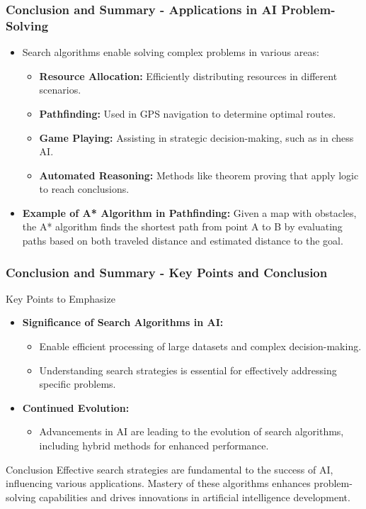 \documentclass[aspectratio=169]{beamer}
\begin{document}
\begin{frame}[fragile]
    \frametitle{Conclusion and Summary - Applications in AI Problem-Solving}
    \begin{itemize}
        \item Search algorithms enable solving complex problems in various areas:
            \begin{itemize}
                \item \textbf{Resource Allocation:} Efficiently distributing resources in different scenarios.
                \item \textbf{Pathfinding:} Used in GPS navigation to determine optimal routes.
                \item \textbf{Game Playing:} Assisting in strategic decision-making, such as in chess AI.
                \item \textbf{Automated Reasoning:} Methods like theorem proving that apply logic to reach conclusions.
            \end{itemize}

        \item \textbf{Example of A* Algorithm in Pathfinding:}
            Given a map with obstacles, the A* algorithm finds the shortest path from point A to B by evaluating paths based on both traveled distance and estimated distance to the goal.
    \end{itemize}
\end{frame}

\begin{frame}[fragile]
    \frametitle{Conclusion and Summary - Key Points and Conclusion}
    \begin{block}{Key Points to Emphasize}
        \begin{itemize}
            \item \textbf{Significance of Search Algorithms in AI:}
                \begin{itemize}
                    \item Enable efficient processing of large datasets and complex decision-making.
                    \item Understanding search strategies is essential for effectively addressing specific problems.
                \end{itemize}
            \item \textbf{Continued Evolution:}
                \begin{itemize}
                    \item Advancements in AI are leading to the evolution of search algorithms, including hybrid methods for enhanced performance.
                \end{itemize}
        \end{itemize}
    \end{block}

    \begin{block}{Conclusion}
        Effective search strategies are fundamental to the success of AI, influencing various applications. Mastery of these algorithms enhances problem-solving capabilities and drives innovations in artificial intelligence development.
    \end{block}
\end{frame}
\end{document}
